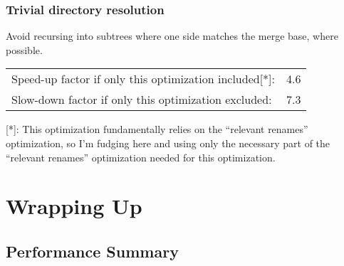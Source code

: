\documentclass[compress,t]{beamer}
\begin{document}
\begin{frame}
  \frametitle{Trivial directory resolution}

  Avoid recursing into subtrees where one side matches the merge base,
  where possible.

  \pause
  \vspace*{\baselineskip}
  \begin{tabular}{lr}
    Speed-up factor if only this optimization included[*]:  & 4.6 \\
    Slow-down factor if only this optimization excluded: & 7.3
  \end{tabular}

  \vspace*{\baselineskip}
  {\scriptsize
  [*]: This optimization fundamentally relies on the ``relevant
  renames'' optimization, so I'm fudging here and using only the
  necessary part of the ``relevant renames'' optimization needed for
  this optimization.
  }

\end{frame}

\section{Wrapping Up}
\subsection{Performance Summary}
\end{document}

